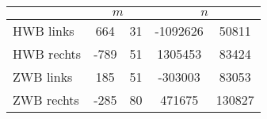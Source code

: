 \label{tab:geraden1}
	\begin{tabular}{lS[table-format=4.0]@{${}\pm{}$}S[table-format=2.0]S[table-format=8.0]@{${}\pm{}$}S[table-format=6.0]}
		\toprule
		{} &  &  \\
		\midrule
		{HWB links}  &  664 & 31 & -1092626 &  50811 \\
		{HWB rechts} & -789 & 51 &  1305453 &  83424 \\
		{ZWB links}  &  185 & 51 &  -303003 &  83053 \\
		{ZWB rechts} & -285 & 80 &   471675 & 130827 \\
		\bottomrule
	\end{tabular}
